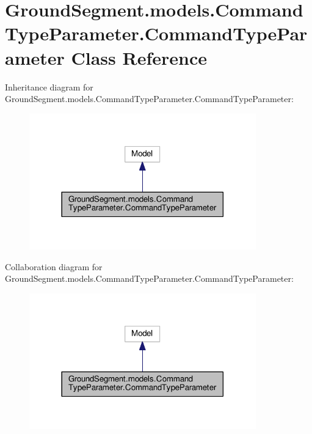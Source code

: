 \hypertarget{class_ground_segment_1_1models_1_1_command_type_parameter_1_1_command_type_parameter}{}\section{Ground\+Segment.\+models.\+Command\+Type\+Parameter.\+Command\+Type\+Parameter Class Reference}
\label{class_ground_segment_1_1models_1_1_command_type_parameter_1_1_command_type_parameter}


Inheritance diagram for Ground\+Segment.\+models.\+Command\+Type\+Parameter.\+Command\+Type\+Parameter\+:\nopagebreak
\begin{figure}[H]
\begin{center}
\leavevmode
\includegraphics[width=278pt]{class_ground_segment_1_1models_1_1_command_type_parameter_1_1_command_type_parameter__inherit__graph}
\end{center}
\end{figure}


Collaboration diagram for Ground\+Segment.\+models.\+Command\+Type\+Parameter.\+Command\+Type\+Parameter\+:\nopagebreak
\begin{figure}[H]
\begin{center}
\leavevmode
\includegraphics[width=278pt]{class_ground_segment_1_1models_1_1_command_type_parameter_1_1_command_type_parameter__coll__graph}
\end{center}
\end{figure}


